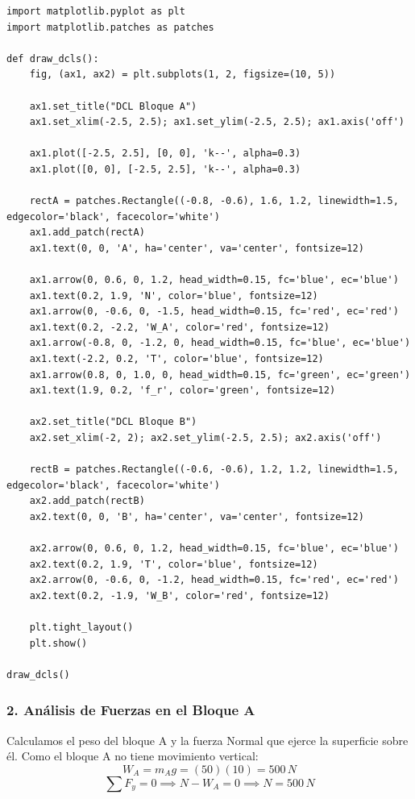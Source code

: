 \documentclass[12pt, a4paper]{article}
\begin{document}
\begin{lstlisting}
import matplotlib.pyplot as plt
import matplotlib.patches as patches

def draw_dcls():
    fig, (ax1, ax2) = plt.subplots(1, 2, figsize=(10, 5))
    
    ax1.set_title("DCL Bloque A")
    ax1.set_xlim(-2.5, 2.5); ax1.set_ylim(-2.5, 2.5); ax1.axis('off')
    
    ax1.plot([-2.5, 2.5], [0, 0], 'k--', alpha=0.3)
    ax1.plot([0, 0], [-2.5, 2.5], 'k--', alpha=0.3)
    
    rectA = patches.Rectangle((-0.8, -0.6), 1.6, 1.2, linewidth=1.5, edgecolor='black', facecolor='white')
    ax1.add_patch(rectA)
    ax1.text(0, 0, 'A', ha='center', va='center', fontsize=12)
    
    ax1.arrow(0, 0.6, 0, 1.2, head_width=0.15, fc='blue', ec='blue')
    ax1.text(0.2, 1.9, 'N', color='blue', fontsize=12)
    ax1.arrow(0, -0.6, 0, -1.5, head_width=0.15, fc='red', ec='red')
    ax1.text(0.2, -2.2, 'W_A', color='red', fontsize=12)
    ax1.arrow(-0.8, 0, -1.2, 0, head_width=0.15, fc='blue', ec='blue')
    ax1.text(-2.2, 0.2, 'T', color='blue', fontsize=12)
    ax1.arrow(0.8, 0, 1.0, 0, head_width=0.15, fc='green', ec='green')
    ax1.text(1.9, 0.2, 'f_r', color='green', fontsize=12)
    
    ax2.set_title("DCL Bloque B")
    ax2.set_xlim(-2, 2); ax2.set_ylim(-2.5, 2.5); ax2.axis('off')
    
    rectB = patches.Rectangle((-0.6, -0.6), 1.2, 1.2, linewidth=1.5, edgecolor='black', facecolor='white')
    ax2.add_patch(rectB)
    ax2.text(0, 0, 'B', ha='center', va='center', fontsize=12)
    
    ax2.arrow(0, 0.6, 0, 1.2, head_width=0.15, fc='blue', ec='blue')
    ax2.text(0.2, 1.9, 'T', color='blue', fontsize=12)
    ax2.arrow(0, -0.6, 0, -1.2, head_width=0.15, fc='red', ec='red')
    ax2.text(0.2, -1.9, 'W_B', color='red', fontsize=12)

    plt.tight_layout()
    plt.show()

draw_dcls()
\end{lstlisting}

\subsubsection*{2. Análisis de Fuerzas en el Bloque A}
Calculamos el peso del bloque A y la fuerza Normal que ejerce la superficie sobre él. Como el bloque A no tiene movimiento vertical:
$$ W_A = m_A g = (50)(10) = 500\,\si{N} $$
$$ \sum F_y = 0 \implies N - W_A = 0 \implies N = 500\,\si{N} $$
\end{document}

